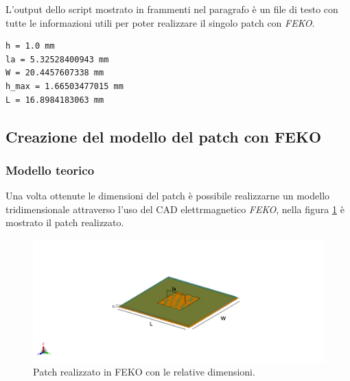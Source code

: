 L'output dello script mostrato in frammenti nel paragrafo è un file di testo con tutte le informazioni utili per poter realizzare il singolo patch con \emph{FEKO}.

\begin{verbatim}
h = 1.0 mm 
la = 5.32528400943 mm 
W = 20.4457607338 mm 
h_max = 1.66503477015 mm 
L = 16.8984183063 mm 
\end{verbatim}

\subsection{Creazione del modello del patch con FEKO}
\subsubsection*{Modello teorico}
Una volta ottenute le dimensioni del patch è possibile realizzarne un modello tridimensionale attraverso l'uso del CAD elettrmagnetico \emph{FEKO}, nella figura \ref{img:patch} è mostrato il patch realizzato.
\begin{figure}
\centering
\caption{Patch realizzato in FEKO con le relative dimensioni.}
\label{img:patch}
\includegraphics[scale=0.5]{Immagini/patch_original_dim}
\end{figure}

